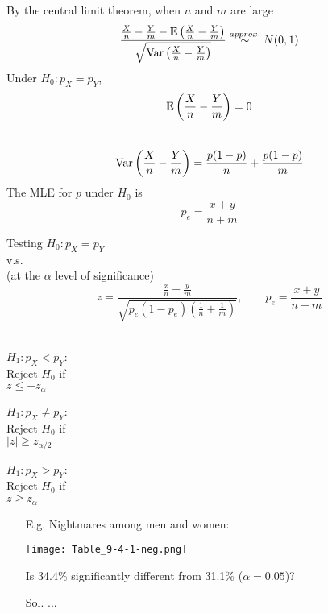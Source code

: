 \begin{frame}
By the central limit theorem, when $n$ and $m$ are large\\[1em]
\[
\frac{ \frac{X}{n}-  \frac{Y}{m}-\mathbb{E}\left(  \frac{X}{n}- \frac{Y}{m}\right)}{\sqrt{\text{Var}\left(  \frac{X}{n}- \frac{Y}{m}\right)}} \stackrel{approx.}{\sim} N(0,1)
\]
\vfill \pause
Under $H_0: p_X=p_Y$, \\[1em]
\[
\mathbb{E}\left(  \frac{X}{n}-  \frac{Y}{m}\right) = 0
\]
\\[1em]\pause
\[
\text{Var}\left(  \frac{X}{n}- \frac{Y}{m}\right) =  \frac{p(1-p)}{n}+\frac{p(1-p)}{m}
\]
\vfill\pause
The MLE for $p$ under $H_0$ is\\[1em]
\[
p_e= \frac{x+y}{n+m}
\]
\end{frame}
\begin{frame}
\centering
Testing $H_0:p_X = p_Y$ \\[1em]
v.s.\\[1em]
(at the $\alpha$ level of significance)\\[1em]
\[
z= \frac{ \frac{x}{n}-\frac{y}{m}}{\sqrt{ p_e(1-p_e) \left( \frac{1}{n}+ \frac{1}{m} \right)}}
,\qquad p_e= \frac{x+y}{n+m}
\]
\\
\vfill

\begin{minipage}{0.32\textwidth}
\centering
$H_1:p_X <p_Y$:\\[1em]
Reject $H_0$ if \\[1em]
$z\le -z_{\alpha}$
\end{minipage}
\begin{minipage}{0.32\textwidth}
\centering
$H_1:p_X \ne p_Y$:\\[1em]
Reject $H_0$ if \\[1em]
$|z| \ge z_{\alpha/2}$
\end{minipage}
\begin{minipage}{0.32\textwidth}
\centering
$H_1:p_X>p_Y$:\\[1em]
Reject $H_0$ if \\[1em]
$z\ge z_{\alpha}$
\end{minipage}
\end{frame}
\begin{frame}

\begin{enumerate}
\item[E.g.] Nightmares among men and women:
\begin{center}
\texttt{[image: Table\_9-4-1-neg.png]}
\end{center}
Is 34.4\% significantly different from 31.1\% ($\alpha=0.05$)?
\vfill
\item[Sol.] ... \myEnd
\end{enumerate}
\end{frame}
